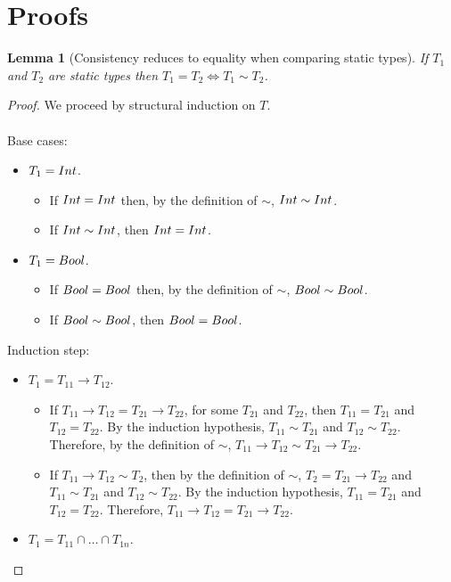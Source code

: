 \documentclass[a4paper]{article}
\newtheorem{lemma}{Lemma}
\begin{document}
\section{Proofs}
\begin{lemma}[Consistency reduces to equality when comparing static types]
\label{consistencytoequality}
If $T_1$ and $T_2$ are static types then $T_1 = T_2 \iff T_1 \sim T_2$.
\end{lemma}
\begin{proof}
We proceed by structural induction on $T$.\\\\
Base cases:
\begin{itemize}
    \item $T_1 = {Int}$.
    \begin{itemize}
        \item If ${Int} = {Int}$ then, by the definition of $\sim$, ${Int} \sim {\ensuremath{Int}}$.
        \item If ${Int} \sim {\ensuremath{Int}}$, then ${Int} = {Int}$.
    \end{itemize}
    \item $T_1 = Bool$.
    \begin{itemize}
        \item If $Bool = Bool$ then, by the definition of $\sim$, $Bool \sim Bool$.
        \item If $Bool \sim Bool$, then $Bool = Bool$.
    \end{itemize}
\end{itemize}
Induction step:
\begin{itemize}
    \item $T_1 = T_{11} \rightarrow T_{12}$.
    \begin{itemize}
        \item If $T_{11} \rightarrow T_{12} = T_{21} \rightarrow T_{22}$, for some $T_{21}$ and $T_{22}$, then $T_{11} = T_{21}$ and $T_{12} = T_{22}$.
        By the induction hypothesis, $T_{11} \sim T_{21}$ and $T_{12} \sim T_{22}$.
        Therefore, by the definition of $\sim$, $T_{11} \rightarrow T_{12} \sim T_{21} \rightarrow T_{22}$.
        \item If $T_{11} \rightarrow T_{12} \sim T_2$, then by the definition of $\sim$, $T_2 = T_{21} \rightarrow T_{22}$ and $T_{11} \sim T_{21}$ and $T_{12} \sim T_{22}$.
        By the induction hypothesis, $T_{11} = T_{21}$ and $T_{12} = T_{22}$.
        Therefore, $T_{11} \rightarrow T_{12} = T_{21} \rightarrow T_{22}$.
    \end{itemize}
    \item $T_1 = T_{11} \cap \ldots \cap T_{1n}$.

\end{itemize}
\end{proof}
\end{document}
